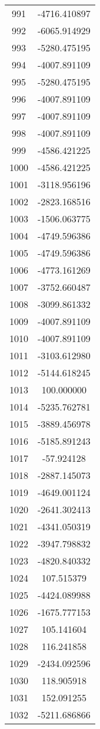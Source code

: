 \documentclass[12pt]{article}
\begin{document}
\begin{longtable}{@{}cc@{}}
991 & -4716.410897 \\
992 & -6065.914929 \\
993 & -5280.475195 \\
994 & -4007.891109 \\
995 & -5280.475195 \\
996 & -4007.891109 \\
997 & -4007.891109 \\
998 & -4007.891109 \\
999 & -4586.421225 \\
1000 & -4586.421225 \\
1001 & -3118.956196 \\
1002 & -2823.168516 \\
1003 & -1506.063775 \\
1004 & -4749.596386 \\
1005 & -4749.596386 \\
1006 & -4773.161269 \\
1007 & -3752.660487 \\
1008 & -3099.861332 \\
1009 & -4007.891109 \\
1010 & -4007.891109 \\
1011 & -3103.612980 \\
1012 & -5144.618245 \\
1013 & 100.000000 \\
1014 & -5235.762781 \\
1015 & -3889.456978 \\
1016 & -5185.891243 \\
1017 & -57.924128 \\
1018 & -2887.145073 \\
1019 & -4649.001124 \\
1020 & -2641.302413 \\
1021 & -4341.050319 \\
1022 & -3947.798832 \\
1023 & -4820.840332 \\
1024 & 107.515379 \\
1025 & -4424.089988 \\
1026 & -1675.777153 \\
1027 & 105.141604 \\
1028 & 116.241858 \\
1029 & -2434.092596 \\
1030 & 118.905918 \\
1031 & 152.091255 \\
1032 & -5211.686866 \\

\end{longtable}
\end{document}
